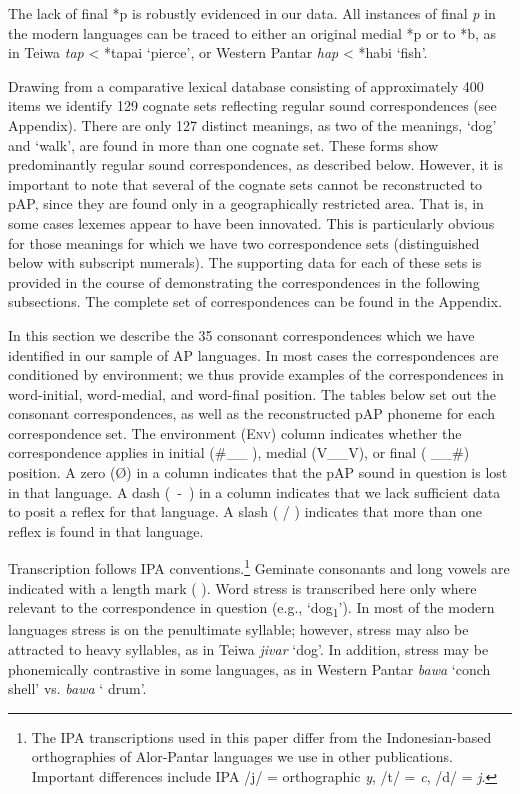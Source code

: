 The lack of final *p is robustly evidenced in our data. All instances of final \textit{p }in the modern languages can be traced to either an original medial *p or to *b, as in Teiwa \textit{tap }{\textless} *tapai\textit{ }{\textquoteleft}pierce{\textquoteright}, or Western Pantar \textit{hap} {\textless} *habi {\textquoteleft}fish{\textquoteright}. 

 Drawing from a comparative lexical database consisting of approximately 400 items we identify 129 cognate sets reflecting regular sound correspondences (see Appendix). There are only 127 distinct meanings, as two of the meanings, {\textquoteleft}dog{\textquoteright} and {\textquoteleft}walk{\textquoteright}, are found in more than one cognate set. These forms show predominantly regular sound correspondences, as described below. However, it is important to note that several of the cognate sets cannot be reconstructed to pAP, since they are found only in a geographically restricted area. That is, in some cases lexemes appear to have been innovated. This is particularly obvious for those meanings for which we have two correspondence sets (distinguished below with subscript numerals). The supporting data for each of these sets is provided in the course of demonstrating the correspondences in the following subsections. The complete set of correspondences can be found in the Appendix. 

In this section we describe the 35 consonant correspondences which we have identified in our sample of AP languages. In most cases the correspondences are conditioned by environment; we thus provide examples of the correspondences in word-initial, word-medial, and word-final position. The tables below set out the consonant correspondences, as well as the reconstructed pAP phoneme for each correspondence set. The environment (\textsc{Env}) column indicates whether the correspondence applies in initial (\#\_\_ ), medial (V\_\_V), or final ( \_\_\#) position. A zero ({\O}) in a column indicates that the pAP sound in question is lost in that language. A dash (~-~) in a column indicates that we lack sufficient data to posit a reflex for that language. A slash ( / ) indicates that more than one reflex is found in that language. 

Transcription follows IPA conventions.\footnote{ The IPA transcriptions used in this paper differ from the Indonesian-based orthographies of Alor-Pantar languages we use in other publications. Important differences include IPA /j/ = orthographic \textit{y},\textit{ }/t{\textesh}/ = \textit{c}, /d{\textyogh}/ = \textit{j}.} Geminate consonants and long vowels are indicated with a length mark ( {\textlengthmark} ). Word stress is transcribed here only where relevant to the correspondence in question (e.g., {\textquoteleft}dog\textsubscript{1}{\textquoteright}). In most of the modern languages stress is on the penultimate syllable; however, stress may also be attracted to heavy syllables, as in Teiwa \textit{ji{\textprimstress}var} {\textquoteleft}dog{\textquoteright}. In addition, stress may be phonemically contrastive in some languages, as in Western Pantar \textit{ba}\textit{{\textprimstress}}\textit{wa} {\textquoteleft}conch shell{\textquoteright} vs. \textit{{\textprimstress}}\textit{bawa} {\textquoteleft}
drum{\textquoteright}.

